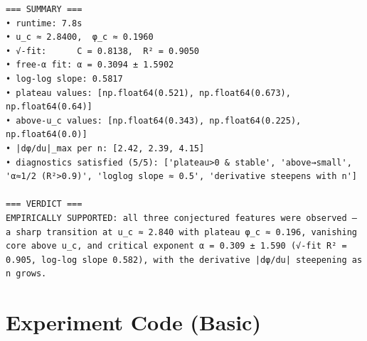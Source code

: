 \documentclass[11pt]{article}
\begin{document}
\begin{lstlisting}
=== SUMMARY ===
• runtime: 7.8s
• u_c ≈ 2.8400,  φ_c ≈ 0.1960
• √-fit:      C = 0.8138,  R² = 0.9050
• free-α fit: α = 0.3094 ± 1.5902
• log-log slope: 0.5817
• plateau values: [np.float64(0.521), np.float64(0.673), np.float64(0.64)]
• above-u_c values: [np.float64(0.343), np.float64(0.225), np.float64(0.0)]
• |dφ/du|_max per n: [2.42, 2.39, 4.15]
• diagnostics satisfied (5/5): ['plateau>0 & stable', 'above→small', 'α≈1/2 (R²>0.9)', 'loglog slope ≈ 0.5', 'derivative steepens with n']

=== VERDICT ===
EMPIRICALLY SUPPORTED: all three conjectured features were observed — a sharp transition at u_c ≈ 2.840 with plateau φ_c ≈ 0.196, vanishing core above u_c, and critical exponent α = 0.309 ± 1.590 (√-fit R² = 0.905, log-log slope 0.582), with the derivative |dφ/du| steepening as n grows.

\end{lstlisting}


\section{Experiment Code (Basic)}
\end{document}
